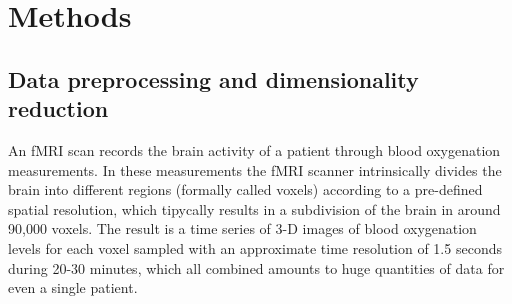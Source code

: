 \documentclass[fleqn,moreauthors,10pt]{ds_report}
\begin{document}
\iffalse    
    Using this data we can also build Functional Connectivity representations between brain regions, which has been shown to find important patterns in brain activity \cite{Matkovič_2024, Wang2021-ts}. One of such representations are connectivity-based graphs convolutional networks (cGCN) architecture for fMRI analysis, allowing the extraction of spatial features from connectomic neighborhoods, showing effectiveness in individual identification and classification of ASD patients in \cite{Wang2021-ts}. The proposed architecture was applied to supervised classification experiments using rs-fMRI data from the Human Connectome Project, showcasing its performance in identifying subjects based on their rs-fMRI data.

        In addition to the patient and control groups PANSS scores, the data is composed of a set of time series of 3D-images for each patient of different regions of the brain, from which we obtain a set of correlation-based connectivity features by finding the correlations between regions across time. We used two of such connectivity feature extraction methods, which has been proposed as imaging markers for several psychiatric disorders \cite{Kraus2020-ut}. Using this data we implemented several Machine learning models to build a binary classifier of sick or healthy patients. Then we escalated the analysis to a multi-label classifier of the different diagnosis of the patients.
\fi



\section*{Methods}
\label{sec:methods}

\subsection*{Data preprocessing and dimensionality reduction}

An fMRI scan records the brain activity of a patient through blood oxygenation measurements. In these measurements the fMRI scanner intrinsically divides the brain into different regions (formally called voxels) according to a pre-defined spatial resolution, which tipycally results in a subdivision of the brain in around 90,000 voxels. The result is a time series of 3-D images of blood oxygenation levels for each voxel sampled with an approximate time resolution of 1.5 seconds during 20-30 minutes, which all combined amounts to huge quantities of data for even a single patient.
\end{document}
